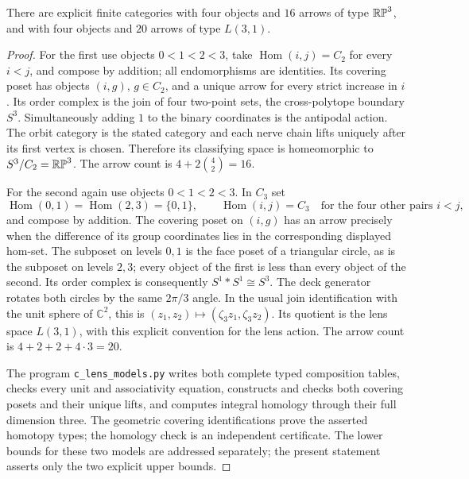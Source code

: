 \begin{proposition}\label{prop:C-lens-uppers}
There are explicit finite categories with four objects and $16$
arrows of type $\mathbb {RP}^3$, and with four objects and $20$ arrows of
type $L(3,1)$.
\end{proposition}
\begin{proof}
For the first use objects $0<1<2<3$, take
$\operatorname{Hom}(i,j)=C_2$ for every $i<j$, and compose by
addition; all endomorphisms are identities. Its covering poset
has objects $(i,g)$, $g\in C_2$, and a unique arrow for every
strict increase in $i$. Its order complex is the join of four
two-point sets, the cross-polytope boundary $S^3$.
Simultaneously adding $1$ to the binary coordinates is the antipodal
action. The orbit category is the stated category and each nerve
chain lifts uniquely after its first vertex is chosen. Therefore
its classifying space is homeomorphic to $S^3/C_2=\mathbb {RP}^3$.
The arrow count is $4+2\binom42=16$.

For the second again use objects $0<1<2<3$. In $C_3$ set
\[
 \operatorname{Hom}(0,1)=\operatorname{Hom}(2,3)=\{0,1\},
 \qquad \operatorname{Hom}(i,j)=C_3
 \quad\text{for the four other pairs }i<j,
\]
and compose by addition. The covering poset on $(i,g)$ has an
arrow precisely when the difference of its group coordinates lies
in the corresponding displayed hom-set. The subposet on levels
$0,1$ is the face poset of a triangular circle, as is the subposet
on levels $2,3$; every object of the first is less than every
object of the second. Its order complex is consequently
$S^1*S^1\cong S^3$. The deck generator rotates both circles
by the same $2\pi/3$ angle. In the usual join identification with
the unit sphere of $\mathbb C^2$, this is
$(z_1,z_2)\mapsto(\zeta_3z_1,\zeta_3z_2)$.
Its quotient is the lens space $L(3,1)$, with this explicit
convention for the lens action. The arrow count is
$4+2+2+4\cdot3=20$.

The program \texttt{c\_lens\_models.py} writes both complete typed
composition tables, checks every unit and associativity equation,
constructs and checks both covering posets and their unique lifts,
and computes integral homology through their full dimension three.
The geometric covering identifications prove the asserted homotopy
types; the homology check is an independent certificate.
The lower bounds for these two models are addressed separately;
the present statement asserts only the two explicit upper bounds.
\end{proof}
